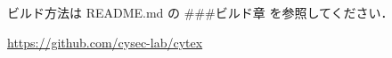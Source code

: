 \documentclass{ltjarticle}
\begin{document}
ビルド方法は README.md の \#\#\#ビルド章 を参照してください．

\url{https://github.com/cysec-lab/cytex}
\end{document}
